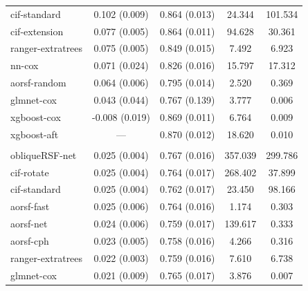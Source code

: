 \documentclass{article}\usepackage[]{graphicx}\usepackage[]{xcolor}
\newenvironment{knitrout}{}{} %
\begin{document}
\begin{knitrout}
\begin{longtable}[t]{lcccc}
\hspace{1em}cif-standard & 0.102 (0.009) & 0.864 (0.013) & 24.344 & 101.534\\
\hspace{1em}cif-extension & 0.077 (0.005) & 0.864 (0.011) & 94.628 & 30.361\\
\hspace{1em}ranger-extratrees & 0.075 (0.005) & 0.849 (0.015) & 7.492 & 6.923\\
\hspace{1em}nn-cox & 0.071 (0.024) & 0.826 (0.016) & 15.797 & 17.312\\
\hspace{1em}aorsf-random & 0.064 (0.006) & 0.795 (0.014) & 2.520 & 0.369\\
\hspace{1em}glmnet-cox & 0.043 (0.044) & 0.767 (0.139) & 3.777 & 0.006\\
\hspace{1em}xgboost-cox & -0.008 (0.019) & 0.869 (0.011) & 6.764 & 0.009\\
\hspace{1em}xgboost-aft & --- & 0.870 (0.012) & 18.620 & 0.010\\
\addlinespace[0.3em]
\multicolumn{5}{l}{\textit{\textbf{MESA; stroke, n = 6783, p = 48}}}\\
\hline
\hspace{1em}obliqueRSF-net & 0.025 (0.004) & 0.767 (0.016) & 357.039 & 299.786\\
\hspace{1em}cif-rotate & 0.025 (0.004) & 0.764 (0.017) & 268.402 & 37.899\\
\hspace{1em}cif-standard & 0.025 (0.004) & 0.762 (0.017) & 23.450 & 98.166\\
\hspace{1em}aorsf-fast & 0.025 (0.006) & 0.764 (0.016) & 1.174 & 0.303\\
\hspace{1em}aorsf-net & 0.024 (0.006) & 0.759 (0.017) & 139.617 & 0.333\\
\hspace{1em}aorsf-cph & 0.023 (0.005) & 0.758 (0.016) & 4.266 & 0.316\\
\hspace{1em}ranger-extratrees & 0.022 (0.003) & 0.759 (0.016) & 7.610 & 6.738\\
\hspace{1em}glmnet-cox & 0.021 (0.009) & 0.765 (0.017) & 3.876 & 0.007\\

\end{longtable}
\end{knitrout}
\end{document}
